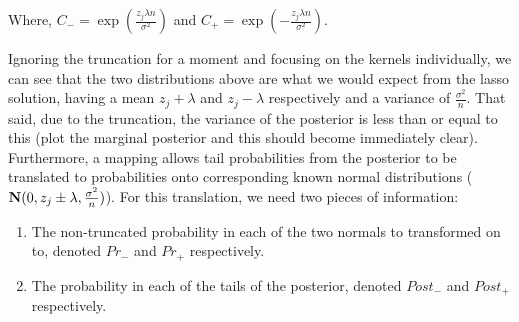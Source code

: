 
Where, $C_{-} = \exp(\frac{z_j \lambda n}{\sigma^2})$ and $C_{+} = \exp(-\frac{z_j \lambda n}{\sigma^2})$.

Ignoring the truncation for a moment and focusing on the kernels individually, we can see that the two distributions above are what we would expect from the lasso solution, having a mean $z_j + \lambda$ and $z_j - \lambda$ respectively and a variance of $\frac{\sigma^2}{n}$. That said, due to the truncation, the variance of the posterior is less than or equal to this (plot the marginal posterior and this should become immediately clear). Furthermore, a mapping allows tail probabilities from the posterior to be translated to probabilities onto corresponding known normal distributions ($\mathbf{N}(0, z_j \pm \lambda, \frac{\sigma^2}{n})$). For this translation, we need two pieces of information:

\begin{enumerate}
\item The non-truncated probability in each of the two normals to transformed on to, denoted $Pr_{-}$ and $Pr_{+}$ respectively.
\item The probability in each of the tails of the posterior, denoted $Post_{-}$ and $Post_{+}$ respectively.
\end{enumerate}


